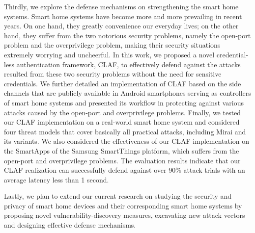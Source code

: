 \documentclass[letterpaper,12pt]{article}
\begin{document}
    Thirdly, we explore the defense mechanisms on strengthening the smart home systems. Smart home systems have become more and more prevailing in recent years. On one hand, they greatly convenience our everyday lives; on the other hand, they suffer from the two notorious security problems, namely the open-port problem and the overprivilege problem, making their security situations extremely worrying and uncheerful. In this work, we proposed a novel credential-less authentication framework, CLAF, to effectively defend against the attacks resulted from these two security problems without the need for sensitive credentials. We further detailed an implementation of CLAF based on the side channels that are publicly available in Android smartphones serving as controllers of smart home systems and presented its workflow in protecting against various attacks caused by the open-port and overprivilege problems. Finally, we tested our CLAF implementation on a real-world smart home system and considered four threat models that cover basically all practical attacks, including Mirai and its variants. We also considered the effectiveness of our CLAF implementation on the SmartApps of the Samsung SmartThings platform, which suffers from the open-port and overprivilege problems. The evaluation results indicate that our CLAF realization can successfully defend against over 90\% attack trials with an average latency less than 1 second.
    
    Lastly, we plan to extend our current research on studying the security and privacy of smart home devices and their corresponding smart home systems by proposing novel vulnerability-discovery measures, excavating new attack vectors and designing effective defense mechanisms.
   
      \newpage

   \tableofcontents
   \restoregeometry
   \newpage


   \cleardoublepage
    \label{listoffig}
   \begin{center}
       \listoffigures
   \end{center}
   \newpage
   
   \cleardoublepage
    \label{listoftbl}
   \begin{center}
       \listoftables
   \end{center}
   \newpage
\end{document}
